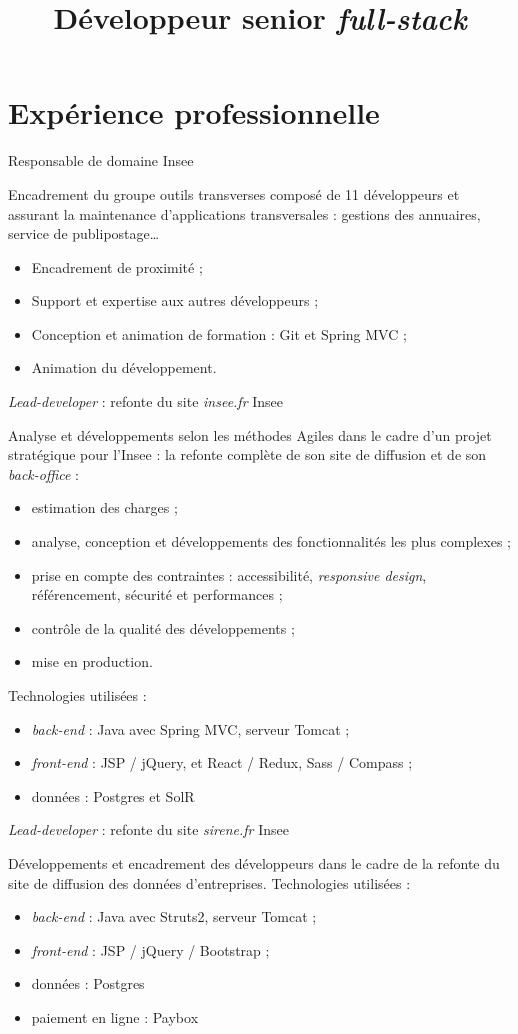 \documentclass[11pt,a4paper,roman]{moderncv}       %
\title{Développeur senior \emph{full-stack}}
\begin{document}
\makecvtitle

\section{Expérience professionnelle}\label{sec:expérience-professionnelle}

{Responsable de domaine}
{Insee}
{}
{}
{Encadrement du groupe \og outils transverses \fg composé de 11 développeurs et assurant la maintenance d'applications transversales : gestions des annuaires, service de publipostage\ldots
\begin{itemize}%
  \item Encadrement de proximité ;
  \item Support et expertise aux autres développeurs ;
  \item Conception et animation de formation : Git et Spring MVC ;
  \item Animation du développement.
\end{itemize}}

{\emph{Lead-developer} : refonte du site \emph{insee.fr}}
{Insee}
{}
{}
{Analyse et développements selon les méthodes Agiles dans le cadre d'un projet stratégique pour l'Insee : la refonte complète de son site de diffusion et de son \emph{back-office} :
\begin{itemize}%
  \item estimation des charges ;
  \item analyse, conception et développements des fonctionnalités les plus complexes ;
  \item prise en compte des contraintes : accessibilité, \emph{responsive design}, référencement,  sécurité et performances ;
  \item contrôle de la qualité des développements ;
  \item mise en production.
\end{itemize}%
Technologies utilisées :
\begin{itemize}%
  \item \emph{back-end} : Java avec Spring MVC, serveur Tomcat ;
  \item \emph{front-end} : JSP / jQuery, et React / Redux, Sass / Compass ;
  \item données : Postgres et SolR
\end{itemize}}

{\emph{Lead-developer} : refonte du site \emph{sirene.fr}}
{Insee}
{}
{}
{Développements et encadrement des développeurs dans le cadre de la refonte du site de diffusion des données d'entreprises.
\newline Technologies utilisées :
\begin{itemize}%
  \item \emph{back-end} : Java avec Struts2, serveur Tomcat ;
  \item \emph{front-end} : JSP / jQuery / Bootstrap ;
  \item données : Postgres
  \item paiement en ligne : Paybox
\end{itemize}}
\end{document}
